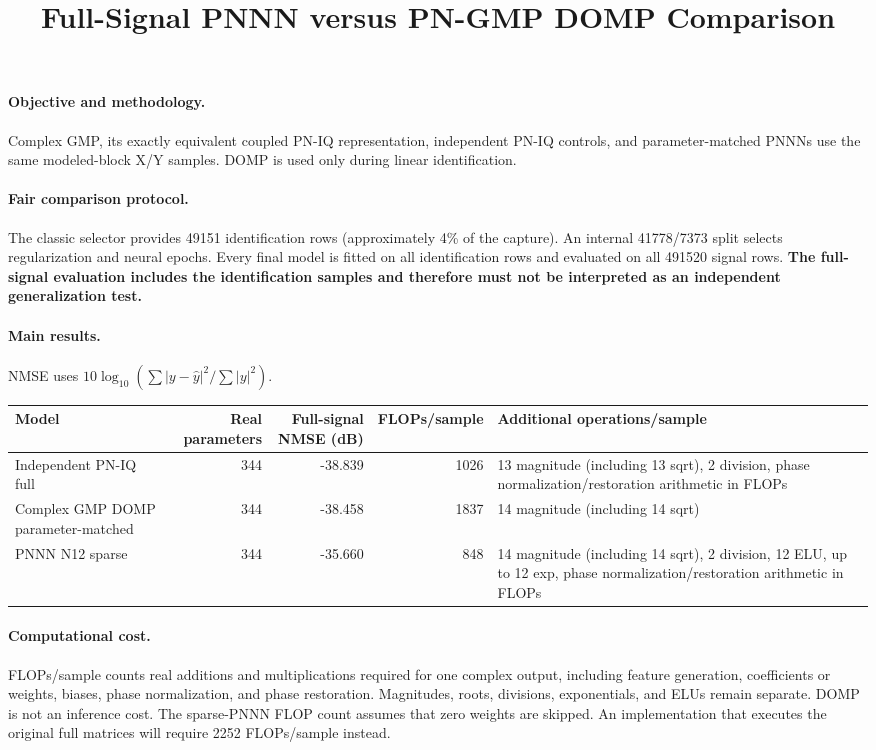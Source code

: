 \documentclass[10pt]{article}
\title{Full-Signal PNNN versus PN-GMP DOMP Comparison}
\author{}\date{}
\begin{document}
\maketitle
\paragraph{Objective and methodology.} Complex GMP, its exactly equivalent coupled PN-IQ representation, independent PN-IQ controls, and parameter-matched PNNNs use the same modeled-block X/Y samples. DOMP is used only during linear identification.
\paragraph{Fair comparison protocol.} The classic selector provides 49151 identification rows (approximately 4\% of the capture). An internal 41778/7373 split selects regularization and neural epochs. Every final model is fitted on all identification rows and evaluated on all 491520 signal rows. \textbf{The full-signal evaluation includes the identification samples and therefore must not be interpreted as an independent generalization test.}
\paragraph{Main results.} NMSE uses $10\log_{10}(\sum|y-\hat y|^2/\sum|y|^2)$.
\begin{center}\small\begin{tabularx}{\linewidth}{XrrrX}
\toprule
Model & Real parameters & Full-signal NMSE (dB) & FLOPs/sample & Additional operations/sample \\ \midrule
Independent PN-IQ full & 344 & -38.839 & 1026 & 13 magnitude (including 13 sqrt), 2 division, phase normalization/restoration arithmetic in FLOPs \\ 
Complex GMP DOMP parameter-matched & 344 & -38.458 & 1837 & 14 magnitude (including 14 sqrt) \\ 
PNNN N12 sparse & 344 & -35.660 & 848 & 14 magnitude (including 14 sqrt), 2 division, 12 ELU, up to 12 exp, phase normalization/restoration arithmetic in FLOPs \\ 
\bottomrule\end{tabularx}\end{center}
\paragraph{Computational cost.} FLOPs/sample counts real additions and multiplications required for one complex output, including feature generation, coefficients or weights, biases, phase normalization, and phase restoration. Magnitudes, roots, divisions, exponentials, and ELUs remain separate. DOMP is not an inference cost. The sparse-PNNN FLOP count assumes that zero weights are skipped. An implementation that executes the original full matrices will require 2252 FLOPs/sample instead.
\end{document}
